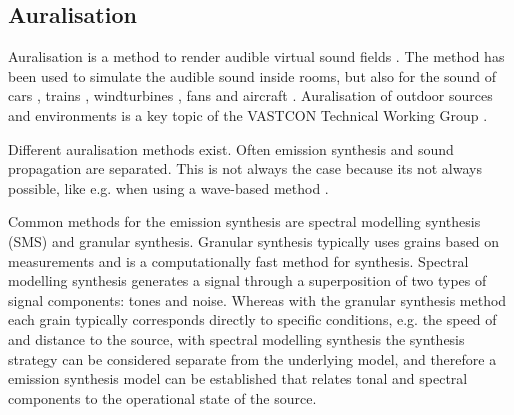 

\subsection{Auralisation}\label{sec:introduction:background:auralisation}%

Auralisation is a method to render audible virtual sound fields \cite{Kleiner1993}.
The method has been used to simulate the audible sound inside
rooms, but also for the sound of
cars \cite{Forssen2009,Maillard2012,Pieren2015,Hoffmann2016,Hoffmann2016a},
trains \cite{Pieren2016},
windturbines \cite{Pieren2014,Heutschi2014},
fans \cite{Merino2016} and
aircraft \cite{Arntzen2014a, Rizzi2016a, Rizzi2016}. Auralisation of outdoor sources
and environments is a key topic of the VASTCON Technical Working Group \cite{Vastcon}.


Different auralisation methods exist. Often emission synthesis and sound
propagation are separated. This is not always the case because its not always
possible, like e.g. when using a wave-based method
\cite{Hornikx2016,Georgiou2016,Georgiou2016a}.

Common methods for the emission synthesis are spectral modelling synthesis (SMS)
and granular synthesis. Granular synthesis typically uses grains based on
measurements and is a computationally fast method for synthesis. Spectral
modelling synthesis generates a signal through a superposition of two types of
signal components: tones and noise. Whereas with the granular synthesis method
each grain typically corresponds directly to specific conditions, e.g. the speed
of and distance to the source, with spectral modelling synthesis the synthesis
strategy can be considered separate from the underlying model, and therefore a
emission synthesis model can be established that relates tonal and spectral
components to the operational state of the source.

